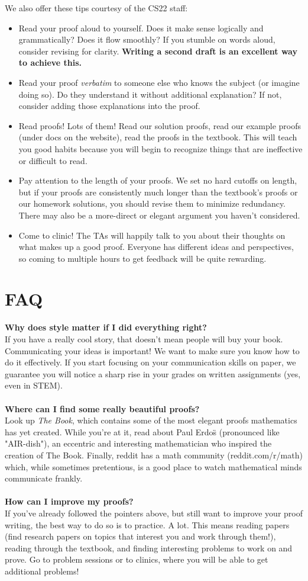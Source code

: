 \documentclass[12pt,letterpaper]{article}
\newcommand{\question}[1]{\textbf{#1}\\}
\newcommand{\answer}[1]{#1\\\\}
\begin{document}
We also offer these tips courtesy of the CS22 staff:
\begin{itemize}
  \item Read your proof aloud to yourself. Does it make sense logically and grammatically? Does it flow smoothly? If you stumble on words aloud, consider revising for clarity. \textbf{Writing a second draft is an excellent way to achieve this.}
  \item Read your proof \textit{verbatim} to someone else who knows the subject (or imagine doing so). Do they understand it without additional explanation? If not, consider adding those explanations into the proof.
  \item Read proofs! Lots of them! Read our solution proofs, read our example proofs (under docs on the website), read the proofs in the textbook. This will teach you good habits because you will begin to recognize things that are ineffective or difficult to read.
  \item Pay attention to the length of your proofs. We set no hard cutoffs on length, but if your proofs are consistently much longer than the textbook's proofs or our homework solutions, you should revise them to minimize redundancy. There may also be a more-direct or elegant argument you haven't considered.
  \item Come to clinic! The TAs will happily talk to you about their thoughts on what makes up a good proof. Everyone has different ideas and perspectives, so coming to multiple hours to get feedback will be quite rewarding.
\end{itemize}

\section*{FAQ}
\question{Why does style matter if I did everything right?}
\answer{If you have a really cool story, that doesn't mean people will buy your book. Communicating your ideas is important! We want to make sure you know how to do it effectively. If you start focusing on your communication skills on paper, we guarantee you will notice a sharp rise in your grades on written assignments (yes, even in STEM).}
\question{Where can I find some really beautiful proofs?}
\answer{Look up \textit{The Book}, which contains some of the most elegant proofs mathematics has yet created. While you're at it, read about Paul Erdo\"s (pronounced like "AIR-dish"), an eccentric and interesting mathematician who inspired the creation of The Book. Finally, reddit has a math community (reddit.com/r/math) which, while sometimes pretentious, is a good place to watch mathematical minds communicate frankly.}
\question{How can I improve my proofs?}
If you've already followed the pointers above, but still want to improve your proof writing, the best way to do so is to practice. A lot. This means reading papers (find research papers on topics that interest you and work through them!), reading through the textbook, and finding interesting problems to work on and prove. Go to problem sessions or to clinics, where you will be able to get additional problems!
\end{document}
